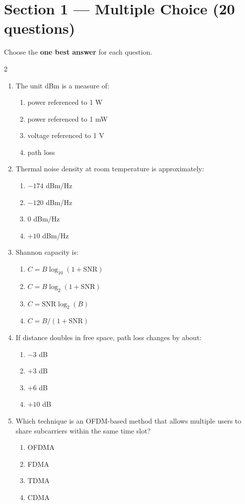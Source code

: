 \section*{Section 1 --- Multiple Choice (20 questions)}
Choose the \textbf{one best answer} for each question.

\vspace{0.3cm}
\begin{multicols}{2}
\begin{enumerate}[leftmargin=*, itemsep=0.4em]
\item The unit dBm is a measure of:
\begin{enumerate}[label=\alph*)]
\item power referenced to 1 W
\item power referenced to 1 mW
\item voltage referenced to 1 V
\item path loss
\end{enumerate}

\item Thermal noise density at room temperature is approximately:
\begin{enumerate}[label=\alph*)]
\item $-174$ dBm/Hz
\item $-120$ dBm/Hz
\item $0$ dBm/Hz
\item $+10$ dBm/Hz
\end{enumerate}

\item Shannon capacity is:
\begin{enumerate}[label=\alph*)]
\item $C = B\log_{10}(1+\mathrm{SNR})$
\item $C = B\log_2(1+\mathrm{SNR})$
\item $C = \mathrm{SNR}\log_2(B)$
\item $C = B/(1+\mathrm{SNR})$
\end{enumerate}

\item If distance doubles in free space, path loss changes by about:
\begin{enumerate}[label=\alph*)]
\item $-3$ dB
\item $+3$ dB
\item $+6$ dB
\item $+10$ dB
\end{enumerate}

\item Which technique is an OFDM-based method that allows multiple users to share subcarriers within the same time slot?
\begin{enumerate}[label=\alph*)]
\item OFDMA
\item FDMA
\item TDMA
\item CDMA
\end{enumerate}


\end{enumerate}
\end{multicols}
